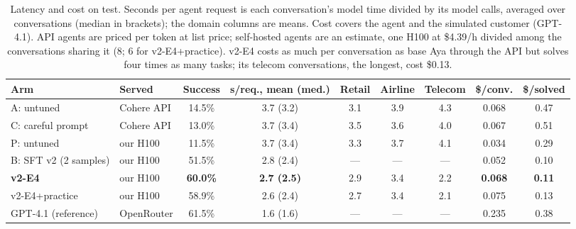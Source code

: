 \documentclass[11pt]{article}
\begin{document}
\begin{table}[t]
\centering
\footnotesize
\setlength{\tabcolsep}{3pt}
\begin{tabular}{@{}llccccccc@{}}
\toprule
\textbf{Arm} & \textbf{Served} & \textbf{Success} & \textbf{s/req., mean (med.)} & \textbf{Retail} & \textbf{Airline} & \textbf{Telecom} & \textbf{\$/conv.} & \textbf{\$/solved} \\
\midrule
A: untuned & Cohere API & 14.5\% & 3.7 (3.2) & 3.1 & 3.9 & 4.3 & 0.068 & 0.47 \\
C: careful prompt & Cohere API & 13.0\% & 3.7 (3.4) & 3.5 & 3.6 & 4.0 & 0.067 & 0.51 \\
P: untuned & our H100 & 11.5\% & 3.7 (3.4) & 3.3 & 3.7 & 4.1 & 0.034 & 0.29 \\
B: SFT v2 (2 samples) & our H100 & 51.5\% & 2.8 (2.4) & --- & --- & --- & 0.052 & 0.10 \\
\textbf{v2-E4} & our H100 & \textbf{60.0\%} & \textbf{2.7 (2.5)} & 2.9 & 3.4 & 2.2 & \textbf{0.068} & \textbf{0.11} \\
v2-E4+practice & our H100 & 58.9\% & 2.6 (2.4) & 2.7 & 3.4 & 2.1 & 0.075 & 0.13 \\
\midrule
GPT-4.1 (reference) & OpenRouter & 61.5\% & 1.6 (1.6) & --- & --- & --- & 0.235 & 0.38 \\
\bottomrule
\end{tabular}
\caption{Latency and cost on test. Seconds per agent request is each conversation's model time divided by its model calls, averaged over conversations (median in brackets); the domain columns are means. Cost covers the agent and the simulated customer (GPT-4.1). API agents are priced per token at list price; self-hosted agents are an estimate, one H100 at \$4.39/h divided among the conversations sharing it (8; 6 for v2-E4+practice). v2-E4 costs as much per conversation as base Aya through the API but solves four times as many tasks; its telecom conversations, the longest, cost \$0.13.}
\label{tab:latency_cost}
\end{table}
\end{document}
